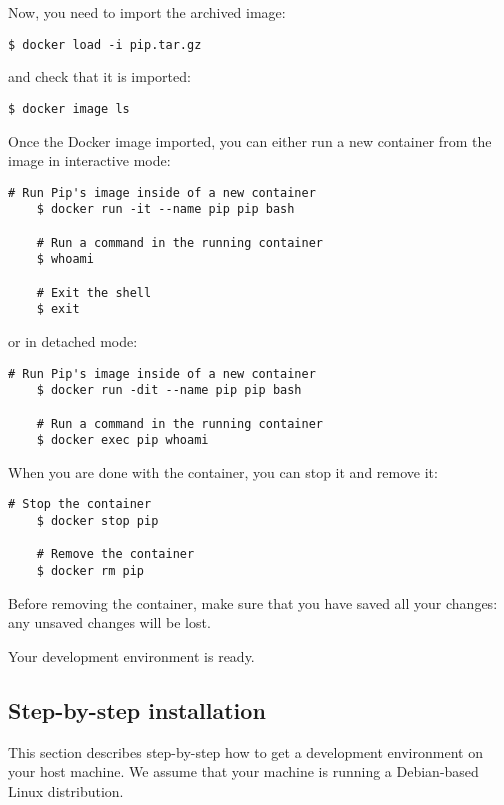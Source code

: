 \documentclass[10pt,a4paper,titlepage]{refart}
\begin{document}
Now, you need to import the archived image:

\begin{lstlisting}[style=BashStyle]
$ docker load -i pip.tar.gz
\end{lstlisting}

and check that it is imported:

\begin{lstlisting}[style=BashStyle]
$ docker image ls
\end{lstlisting}

Once the Docker image imported, you can either run a new container from the
image in interactive mode:

\begin{lstlisting}[style=BashStyle]
    # Run Pip's image inside of a new container
    $ docker run -it --name pip pip bash

    # Run a command in the running container
    $ whoami

    # Exit the shell
    $ exit
\end{lstlisting}

or in detached mode:

\begin{lstlisting}[style=BashStyle]
    # Run Pip's image inside of a new container
    $ docker run -dit --name pip pip bash

    # Run a command in the running container
    $ docker exec pip whoami
\end{lstlisting}

When you are done with the container, you can stop it and remove it:

\begin{lstlisting}[style=BashStyle]
    # Stop the container
    $ docker stop pip

    # Remove the container
    $ docker rm pip
\end{lstlisting}

Before removing the container, make sure that you have saved all your changes:
any unsaved changes will be lost.

Your development environment is ready.

\subsection{Step-by-step installation}

This section describes step-by-step how to get a development environment on your
host machine. We assume that your machine is running a Debian-based Linux
distribution.
\end{document}
